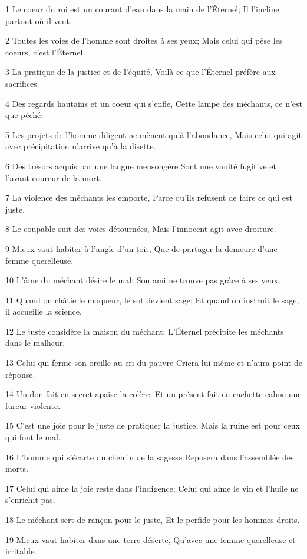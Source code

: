 \par 1 Le coeur du roi est un courant d'eau dans la main de l'Éternel; Il l'incline partout où il veut.
\par 2 Toutes les voies de l'homme sont droites à ses yeux; Mais celui qui pèse les coeurs, c'est l'Éternel.
\par 3 La pratique de la justice et de l'équité, Voilà ce que l'Éternel préfère aux sacrifices.
\par 4 Des regards hautains et un coeur qui s'enfle, Cette lampe des méchants, ce n'est que péché.
\par 5 Les projets de l'homme diligent ne mènent qu'à l'abondance, Mais celui qui agit avec précipitation n'arrive qu'à la disette.
\par 6 Des trésors acquis par une langue mensongère Sont une vanité fugitive et l'avant-coureur de la mort.
\par 7 La violence des méchants les emporte, Parce qu'ils refusent de faire ce qui est juste.
\par 8 Le coupable suit des voies détournées, Mais l'innocent agit avec droiture.
\par 9 Mieux vaut habiter à l'angle d'un toit, Que de partager la demeure d'une femme querelleuse.
\par 10 L'âme du méchant désire le mal; Son ami ne trouve pas grâce à ses yeux.
\par 11 Quand on châtie le moqueur, le sot devient sage; Et quand on instruit le sage, il accueille la science.
\par 12 Le juste considère la maison du méchant; L'Éternel précipite les méchants dans le malheur.
\par 13 Celui qui ferme son oreille au cri du pauvre Criera lui-même et n'aura point de réponse.
\par 14 Un don fait en secret apaise la colère, Et un présent fait en cachette calme une fureur violente.
\par 15 C'est une joie pour le juste de pratiquer la justice, Mais la ruine est pour ceux qui font le mal.
\par 16 L'homme qui s'écarte du chemin de la sagesse Reposera dans l'assemblée des morts.
\par 17 Celui qui aime la joie reste dans l'indigence; Celui qui aime le vin et l'huile ne s'enrichit pas.
\par 18 Le méchant sert de rançon pour le juste, Et le perfide pour les hommes droits.
\par 19 Mieux vaut habiter dans une terre déserte, Qu'avec une femme querelleuse et irritable.
